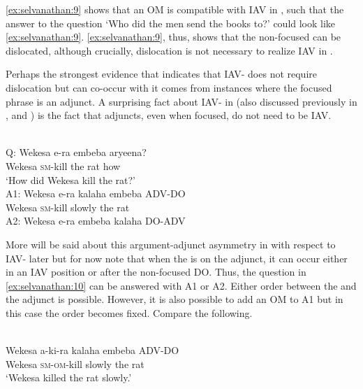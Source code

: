 \documentclass[output=paper
,newtxmath
,modfonts
,nonflat]{langsci/langscibook}
\begin{document}
\ref{ex:selvanathan:9} shows that an OM is compatible with IAV  in , such that the answer to the question ‘Who did the men send the books to?’ could look like \ref{ex:selvanathan:9}. \ref{ex:selvanathan:9}, thus, shows that the non-focused  can be dislocated, although crucially, dislocation is not necessary to realize IAV  in .

Perhaps the strongest evidence that indicates that  IAV- does not require dislocation but can co-occur with it comes from instances where the focused phrase is an adjunct. A surprising fact about IAV- in  (also discussed previously in \citet{Carstens2013}, and \citet{safirforthcoming}) is the fact that  adjuncts, even when focused, do not need to be IAV.

\ea\label{ex:selvanathan:10}
\\

Q: \gll Wekesa   e-ra     embeba   aryeena? \\
	Wekesa   \textsc{sm}{}-kill   {the rat}    how \\
\glt \-\hspace{0.5cm}`How did Wekesa kill the rat?' \\

A1: \gll Wekesa    e-ra   kalaha   embeba ADV-DO \\
Wekesa   \textsc{sm}{}-kill   slowly    {the rat} \\

A2: \gll Wekesa    e-ra   embeba   kalaha   DO-ADV\\
\z

More will be said about this argument-adjunct asymmetry in  with respect to IAV- later but for now note that when the  is on the adjunct, it can occur either in an IAV position or after the non-focused DO. Thus, the question in \ref{ex:selvanathan:10} can be answered with A1 or A2. Either order between the  and the adjunct is possible. However, it is also possible to add an OM to A1 but in this case the order becomes fixed. Compare the following.

\ea\label{ex:selvanathan:11}
\\
\ea\label{ex:selvanathan:11a}
\gll Wekesa  a-ki-ra   kalaha   embeba  ADV-DO\\
Wekesa  \textsc{sm}{}-\textsc{om}{}-kill  slowly    {the rat}\\
\glt `Wekesa killed the rat slowly.' 
\end{document}

